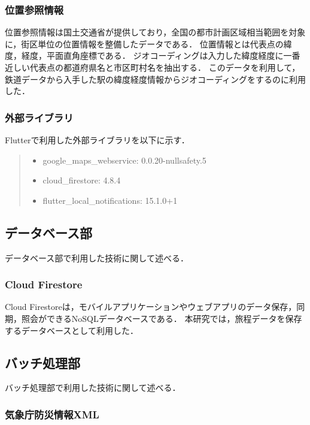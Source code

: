 \subsubsection{位置参照情報}
位置参照情報\cite{Geocoding}は国土交通省が提供しており，全国の都市計画区域相当範囲を対象に，街区単位の位置情報を整備したデータである．
位置情報とは代表点の緯度，経度，平面直角座標である．
ジオコーディングは入力した緯度経度に一番近しい代表点の都道府県名と市区町村名を抽出する．
このデータを利用して，鉄道データから入手した駅の緯度経度情報からジオコーディングをするのに利用した．

\subsubsection{外部ライブラリ}
Flutterで利用した外部ライブラリを以下に示す．

\begin{quote}
  \begin{itemize}
    \item google\_maps\_webservice: 0.0.20-nullsafety.5
    \item cloud\_firestore: 4.8.4
    \item flutter\_local\_notifications: 15.1.0+1
  \end{itemize}
\end{quote}

\subsection{データベース部}
データベース部で利用した技術に関して述べる．

\subsubsection{Cloud Firestore}

Cloud Firestore\cite{Firebase}は，モバイルアプリケーションやウェブアプリのデータ保存，同期，照会ができるNoSQLデータベースである．
本研究では，旅程データを保存するデータベースとして利用した．

\subsection{バッチ処理部}
バッチ処理部で利用した技術に関して述べる．

\subsubsection{気象庁防災情報XML}

